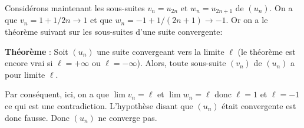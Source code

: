 {{\vspace{0.3cm}

Consid\'erons maintenant les sous-suites $v_n=u_{2n}$ et
$w_n=u_{2n+1}$ de $(u_n)$. On a que $v_n=1+1/2n\rightarrow1$ et que
$w_n=-1+1/(2n+1)\rightarrow -1$. Or on a le th\'eor\`eme suivant sur les
sous-suites d'une suite convergente:

\textbf{Th\'eor\`eme} : Soit $(u_n)$ une suite convergeant  vers la
limite $\ell$ (le th\'eor\`eme est encore vrai si $\ell=+\infty$ ou
$\ell=-\infty$). Alors, toute sous-suite $(v_n)$ de $(u_n)$ a pour limite
$\ell$.


Par cons\'equent, ici, on a que $\lim v_n=\ell$ et $\lim w_n=\ell$  donc
$\ell=1$ et $\ell=-1$ ce qui est une contradiction. L'hypoth\`ese disant
que $(u_n)$ \'etait convergente est donc fausse. Donc $(u_n)$ ne
converge pas.
}
}
